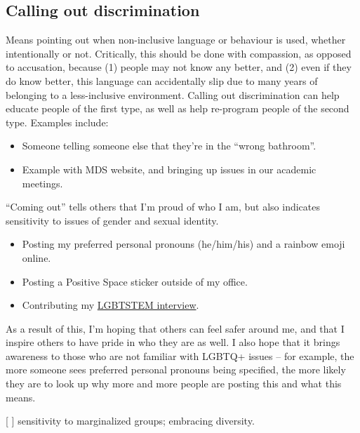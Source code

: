 \documentclass[]{book}
\providecommand{\tightlist}{%
  \setlength{\itemsep}{0pt}\setlength{\parskip}{0pt}}
\begin{document}
\hypertarget{calling-out-discrimination}{%
\subsection{Calling out discrimination}\label{calling-out-discrimination}}

Means pointing out when non-inclusive language or behaviour is used, whether intentionally or not. Critically, this should be done with compassion, as opposed to accusation, because (1) people may not know any better, and (2) even if they do know better, this language can accidentally slip due to many years of belonging to a less-inclusive environment. Calling out discrimination can help educate people of the first type, as well as help re-program people of the second type. Examples include:

\begin{itemize}
\tightlist
\item
  Someone telling someone else that they're in the ``wrong bathroom''.
\item
  Example with MDS website, and bringing up issues in our academic meetings.
\end{itemize}

``Coming out'' tells others that I'm proud of who I am, but also indicates sensitivity to issues of gender and sexual identity.

\begin{itemize}
\tightlist
\item
  Posting my preferred personal pronouns (he/him/his) and a rainbow emoji online.
\item
  Posting a Positive Space sticker outside of my office.
\item
  Contributing my \href{https://lgbtstem.wordpress.com/2019/11/09/an-interview-with-vincenzo-coia/}{LGBTSTEM interview}.
\end{itemize}

As a result of this, I'm hoping that others can feel safer around me, and that I inspire others to have pride in who they are as well. I also hope that it brings awareness to those who are not familiar with LGBTQ+ issues -- for example, the more someone sees preferred personal pronouns being specified, the more likely they are to look up why more and more people are posting this and what this means.

{[} {]} sensitivity to marginalized groups; embracing diversity.
\end{document}
